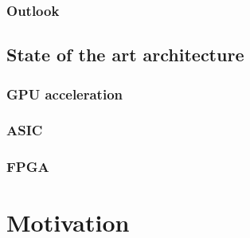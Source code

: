 \subsubsection{Outlook}

\subsection{State of the art architecture}

\subsubsection{GPU acceleration}

\subsubsection{ASIC}

\subsubsection{FPGA}

\section{Motivation}
